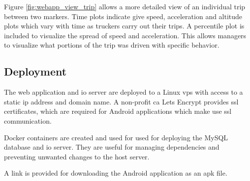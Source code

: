 Figure \ref{fig:webapp_view_trip} allows a more detailed view of an individual trip between two markers.
Time plots indicate give speed, acceleration and altitude plots which vary with time as truckers carry out their trips.
A percentile plot is included to visualize the spread of speed and acceleration.
This allows managers to visualize what portions of the trip was driven with specific behavior.

\pagebreak
\subsection{Deployment}
The web application and \ac{io} server are deployed to a Linux \ac{vps} with access to a static \ac{ip} address and domain name.
A non-profit \ac{ca} Lets Encrypt provides \ac{ssl} certificates, which are required for Android applications which make use \ac{ssl} communication.

Docker containers are created and used for used for deploying the MySQL database and \ac{io} server. 
They are useful for managing dependencies and preventing unwanted changes to the host server.

A link is provided for downloading the Android application as an \ac{apk} file.

\pagebreak
